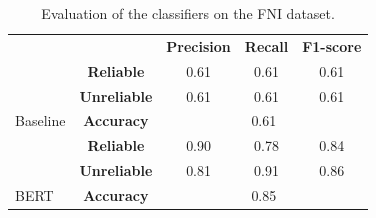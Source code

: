 
\begin{table}[H]
    \centering
\begin{tabular}{lc|c|c|c|}
\cline{3-5}
                                                                 &                     & \textbf{Precision} & \textbf{Recall} & \textbf{F1-score} \\ \cline{2-5} 
\multicolumn{1}{l|}{\cellcolor[HTML]{FFCCC9}}                    & \textbf{Reliable}   & 0.61               & 0.61            & 0.61              \\ \cline{2-5} 
\multicolumn{1}{l|}{\cellcolor[HTML]{FFCCC9}}                    & \textbf{Unreliable} & 0.61               & 0.61            & 0.61              \\ \cline{2-5} 
\multicolumn{1}{l|}{\multirow{-3}{*}{\cellcolor[HTML]{FFCCC9}Baseline}} & \textbf{Accuracy}   & \multicolumn{3}{c|}{0.61}                                \\ \hline \hline 
\multicolumn{1}{l|}{\cellcolor[HTML]{DAE8FC}}                    & \textbf{Reliable}   & 0.90               & 0.78            & 0.84              \\ \cline{2-5} 
\multicolumn{1}{l|}{\cellcolor[HTML]{DAE8FC}}                    & \textbf{Unreliable} & 0.81               & 0.91            & 0.86              \\ \cline{2-5} 
\multicolumn{1}{l|}{\multirow{-3}{*}{\cellcolor[HTML]{DAE8FC}BERT}} & \textbf{Accuracy}   & \multicolumn{3}{c|}{0.85}                                \\ \cline{2-5} 
\end{tabular}
    \caption{Evaluation of the classifiers on the FNI dataset.}
    \label{tab:fni_comp}
\end{table}

